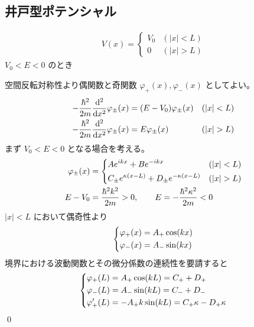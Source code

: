 \documentclass[uplatex,dvipdfmx,a4paper,11pt]{jlreq}
\makeatletter
\numberwithin{equation}{section}
\theoremstyle{definition}
\renewenvironment{proof}[1][\proofname]{\par
  \normalfont
  \topsep6\p@\@plus6\p@ \trivlist
  \item[\hskip\labelsep{\bfseries #1}\@addpunct{\bfseries}]\ignorespaces\quad\par
}{%
  \qed\endtrivlist\@endpefalse
}
\renewcommand\proofname{証明}
\makeatother
\begin{document}
\subsection{井戸型ポテンシャル}
\begin{proposition}
  \begin{align}
    V(x) =
    \begin{cases}
      V_0 & (|x| < L) \\
      0   & (|x| > L)
    \end{cases}
  \end{align}
  $V_0 < E < 0$ のとき
\end{proposition}
\begin{proof}
  空間反転対称性より偶関数と奇関数 $\varphi_+(x), \varphi_-(x)$ としてよい。
  \begin{align}
    -\frac{\hbar^2}{2m}\dv[2]{x}\varphi_{\pm}(x) & = (E - V_0)\varphi_{\pm}(x) & (|x| < L) \\
    -\frac{\hbar^2}{2m}\dv[2]{x}\varphi_{\pm}(x) & = E\varphi_{\pm}(x)         & (|x| > L)
  \end{align}
  まず $V_0 < E < 0$ となる場合を考える。
  \begin{align}
    \varphi_{\pm}(x) & = \begin{dcases}
                           Ae^{ikx} + Be^{-ikx}                               & (|x| < L) \\
                           C_\pm e^{\kappa(x - L)} + D_\pm e^{-\kappa(x - L)} & (|x| > L)
                         \end{dcases} \\
    E - V_0          & = \frac{\hbar^2k^2}{2m} > 0, \qquad E = -\frac{\hbar^2\kappa^2}{2m} < 0
  \end{align}
  $|x| < L$ において偶奇性より
  \begin{align}
    \begin{dcases}
      \varphi_+(x) = A_+\cos(kx) \\
      \varphi_-(x) = A_-\sin(kx)
    \end{dcases}
  \end{align}
  境界における波動関数とその微分係数の連続性を要請すると
  \begin{align}
    \begin{dcases}
      \varphi_+(L) = A_+\cos(kL) = C_+ + D_+                \\
      \varphi_-(L) = A_-\sin(kL) = C_- + D_-                \\
      \varphi_+'(L) = -A_+k\sin(kL) = C_+\kappa - D_+\kappa \\

\end{dcases}
\end{align}
\end{proof}
\end{document}
